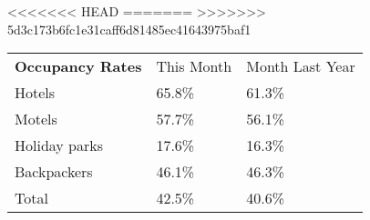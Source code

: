<<<<<<< HEAD
=======
>>>>>>> 5d3c173b6fc1e31caff6d81485ec41643975baf1
\begin{tabular}[t]{p{4.5cm}>{\hfill}p{1.3cm}>{\hfill}p{1.7cm}}
 \textbf{Occupancy Rates} & This Month & Month Last Year \\ 
 Hotels & 65.8\% & 61.3\% \\ 
  Motels & 57.7\% & 56.1\% \\ 
  Holiday parks & 17.6\% & 16.3\% \\ 
  Backpackers & 46.1\% & 46.3\% \\ 
  Total & 42.5\% & 40.6\% \\ 
  \end{tabular}
